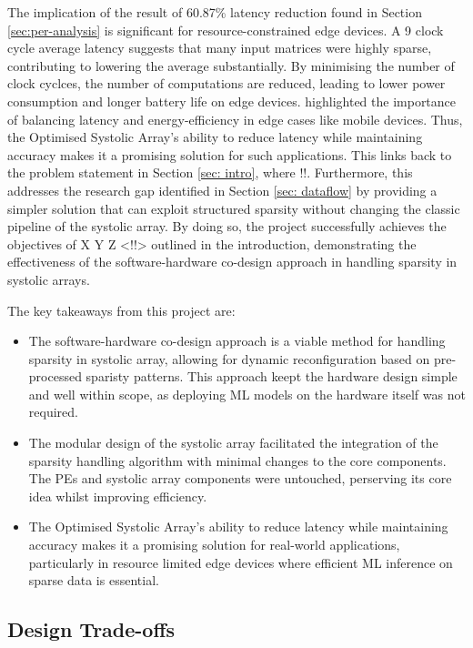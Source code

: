 \documentclass[12pt, a4paper, ukenglish]{article}
\begin{document}
    The implication of the result of 60.87\% latency reduction found in Section \ref{sec:per-analysis} is significant for resource-constrained edge devices. A 9 clock cycle average latency suggests that many input matrices were highly sparse, contributing to lowering the average substantially. By minimising the number of clock cyclces, the number of computations are reduced, leading to lower power consumption and longer battery life on edge devices. \textcite{wang_rethinking_2017} highlighted the importance of balancing latency and energy-efficiency in edge cases like mobile devices. Thus, the Optimised Systolic Array's ability to reduce latency while maintaining accuracy makes it a promising solution for such applications. This links back to the problem statement in Section \ref{sec: intro}, where !!. Furthermore, this addresses the research gap identified in Section \ref{sec: dataflow} by providing a simpler solution that can exploit structured sparsity without changing the classic pipeline of the systolic array. By doing so, the project successfully achieves the objectives of X Y Z <!!> outlined in the introduction, demonstrating the effectiveness of the software-hardware co-design approach in handling sparsity in systolic arrays.

    The key takeaways from this project are: 
    \begin{itemize}
        \item The software-hardware co-design approach is a viable method for handling sparsity in systolic array, allowing for dynamic reconfiguration based on pre-processed sparisty patterns. This approach keept the hardware design simple and well within scope, as deploying ML models on the hardware itself was not required. 
        \item The modular design of the systolic array facilitated the integration of the sparsity handling algorithm with minimal changes to the core components. The PEs and systolic array components were untouched, perserving its core idea whilst improving efficiency.
        \item The Optimised Systolic Array's ability to reduce latency while maintaining accuracy makes it a promising solution for real-world applications, particularly in resource limited edge devices where efficient ML inference on sparse data is essential.
    \end{itemize}



    \subsection{Design Trade-offs} \label{sec: trade-offs}
\end{document}
